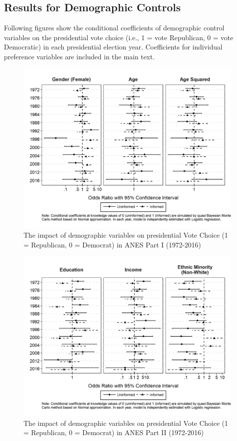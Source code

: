 \subsection{Results for Demographic Controls} 

\par Following figures show the conditional coefficients of demographic control variables on the presidential vote choice (i.e., 1 = vote Republican, 0 = vote Democratic) in each presidential election year. Coefficients for individual preference variables are included in the main text. 

\begin{figure}[ht!!!]
    \caption{The impact of demographic variables on presidential Vote Choice (1 = Republican, 0 = Democrat) in ANES Part I (1972-2016)}
    \label{fig:anescoefplot_dem1}
    \includegraphics[width=\linewidth]{../outputs/m1sq_anescoefplot_dem1.png}
\end{figure}

\begin{figure}[ht!!!]
    \caption{The impact of demographic variables on presidential Vote Choice (1 = Republican, 0 = Democrat) in ANES Part II (1972-2016)}
    \label{fig:anescoefplot_dem2}
    \includegraphics[width=\linewidth]{../outputs/m1sq_anescoefplot_dem2.png}
\end{figure}

